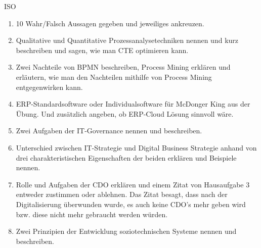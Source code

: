\documentclass{article}
\begin{document}
\begin{exercise}{ISO}
  \begin{enumerate}
    \item 10 Wahr/Falsch Aussagen gegeben und jeweiliges ankreuzen.
    \item Qualitative und Quantitative Prozessanalysetechniken nennen und kurz beschreiben und sagen, wie man CTE optimieren kann.
    \item Zwei Nachteile von BPMN beschreiben, Process Mining erklären und erläutern, wie man den Nachteilen mithilfe von Process Mining entgegenwirken kann.
    \item ERP-Standardsoftware oder Individualsoftware für McDonger King aus der Übung. Und zusätzlich angeben, ob ERP-Cloud Lösung sinnvoll wäre.
    \item Zwei Aufgaben der IT-Governance nennen und beschreiben.
    \item Unterschied zwischen IT-Strategie und Digital Business Strategie anhand von drei charakteristischen Eigenschaften der beiden erklären und Beispiele nennen.
    \item Rolle und Aufgaben der CDO erklären und einem Zitat von Hausaufgabe 3 entweder zustimmen oder ablehnen. Das Zitat besagt, dass nach der Digitalisierung überwunden wurde, es auch keine CDO's mehr geben wird bzw. diese nicht mehr gebraucht werden würden.
    \item Zwei Prinzipien der Entwicklung soziotechnischen Systeme nennen und beschreiben.
  \end{enumerate}
\end{exercise}


\end{document}
